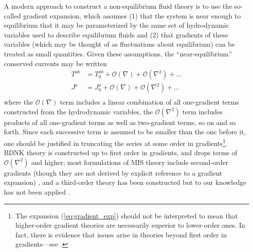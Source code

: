 \documentclass[%
notitlepage,
superscriptaddress,
nofootinbib,
amsmath,
amssymb,
aps,
twocolumn
]{revtex4-1}
\begin{document}
A modern approach to construct a non-equilibrium fluid theory is to use the so-called gradient expansion, which assumes (1) that the system is near enough to equilibrium that it may be parameterized by the same set of hydrodynamic variables used to describe equilibrium fluids and (2) that gradients of these variables (which may be thought of as fluctuations about equilibrium) can be treated as small quantities.  Given these assumptions, the ``near-equilibrium'' conserved currents may be written
\begin{equation} \label{eq:gradient_exp}
\begin{aligned}
T^{ab} &= T^{ab}_{0} + \mathcal{O}(\nabla) + \mathcal{O}(\nabla^2) + ... \\
J^{a}  &= J^{a}_{0}  + \mathcal{O}(\nabla) + \mathcal{O}(\nabla^2) + ... \\
\end{aligned}
\end{equation}
where the $\mathcal{O}(\nabla)$ term includes a linear combination of all one-gradient terms constructed from the hydrodynamic variables, the $\mathcal{O}(\nabla^2)$ term includes products of all one-gradient terms as well as two-gradient terms, so on and so forth.  Since each successive term is assumed to be smaller than the one before it, one should be justified in truncating the series at some order in gradients\footnote{The expansion (\ref{eq:gradient_exp}) should not be interpreted to mean that higher-order gradient theories are necessarily superior to lower-order ones. In fact, there is evidence that issues arise in theories beyond first order in gradients---see \cite{DESCHEPPER19741,Kovtun:2011np}.}.  BDNK theory is constructed up to first order in gradients, and drops terms of $\mathcal{O}(\nabla^2)$ and higher; most formulations of MIS theory include second-order gradients (though they are not derived by explicit reference to a gradient expansion) \cite{Baier:2007ix,Muller_1967,Israel:1976tn,Israel_1979}, and a third-order theory has been constructed but to our knowledge has not been applied \cite{Grozdanov_2016,Muronga:2010zz}.
\end{document}
